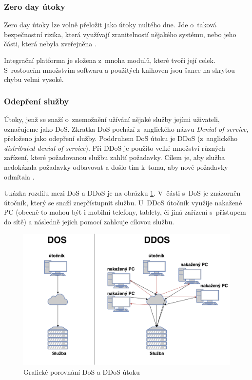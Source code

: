 \documentclass[thesis=M,czech]{FITthesis}[2012/10/20]
\newcommand{\tmpframe}[1]{\fbox{#1}}
\renewcommand{\tmpframe}[1]{#1}
\begin{document}
			\subsubsection{Zero day útoky}
				\label{sec:zero-day}
				Zero day útoky lze volně přeložit jako útoky nultého dne.
				Jde o~taková bezpečnostní rizika, která využívají zranitelností nějakého systému, nebo jeho části, která nebyla zveřejněna \cite{investigationZ0}.
				
				Integrační platforma je složena z~mnoha modulů, které tvoří její celek. S~rostoucím množstvím softwaru a použitých knihoven jsou šance na skrytou chybu velmi vysoké. 
			
			\subsubsection{Odepření služby}
				Útoky, jenž se snaží o~znemožnění užívání nějaké služby jejími uživateli, označujeme jako DoS. Zkratka DoS pochází z~anglického názvu \textit{Denial of service}, přeloženo jako odepření služby. Poddruhem DoS útoku je DDoS (z~anglického \textit{distributed denial of service}). Při DDoS je použito velké množství různých zařízení, které požadovanou službu zahltí požadavky. Cílem je, aby služba nedokázala požadavky odbavovat a došlo tím k~tomu, aby nové požadavky odmítala \cite{dosAndDdos}.
				
				Ukázka rozdílu mezi DoS a DDoS je na obrázku \ref{fig:ddos}. V~části s~DoS je znázorněn útočník, který se snaží znepřístupnit službu. U~DDoS útočník využije nakažené PC (obecně to mohou být i mobilní telefony, tablety, či jiná zařízení s~přístupem do sítě) a následně jejich pomocí zahlcuje cílovou službu.	
				
				\begin{figure}[htb]\centering
					\tmpframe{\includegraphics[width=\textwidth]{./img/ddos}}		
					\caption{Grafické porovnání DoS a DDoS útoku}
					\label{fig:ddos}
				\end{figure}
				
\end{document}
